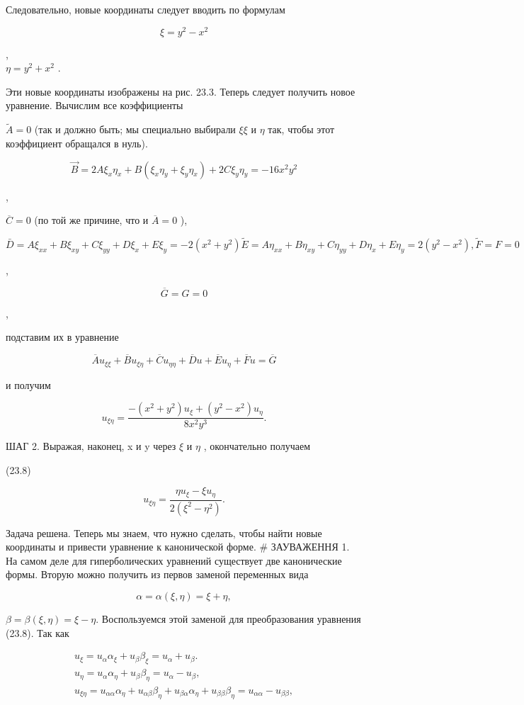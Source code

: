 \documentclass[
  ukrainian,
]{article}
\begin{document}
Следовательно, новые координаты следует вводить по формулам

\[
\xi = y^2 - x^2
\]

,\\
\(\eta = y^2 + x^2\) .

Эти новые координаты изображены на рис. 23.3. Теперь следует получить
новое уравнение. Вычислим все коэффициенты

\(\widetilde{A} = 0\) (так и должно быть; мы специально выбирали
\(\xi \xi\) и \(\eta\) так, чтобы этот коэффициент обращался в нуль).

\[
\vec{B} = 2A\xi_x\eta_x + B(\xi_x\eta_y + \xi_y\eta_x) + 2C\xi_y\eta_y = -16x^2y^2
\]

,

\(\overline{C} = 0\) (по той же причине, что и \(\overline{A} = 0\) ),

\[
\bar{D} = A\xi_{xx} + B\xi_{xy} + C\xi_{yy} + D\xi_x + E\xi_y = -2(x^2 + y^2)
\widetilde{E} = A\eta_{xx} + B\eta_{xy} + C\eta_{yy} + D\eta_x + E\eta_y = 2(y^2 - x^2),
\tilde{F} = F = 0
\]

,

\[
\overline{G} = G = 0
\]

,

подставим их в уравнение

\[
\overline{A}u_{\xi\xi} + \overline{B}u_{\xi\eta} + \overline{C}u_{\eta\eta} + \overline{D}u + \overline{E}u_{\eta} + \overline{F}u = \overline{G}
\]

и получим

\[
u_{\xi\eta} = \frac{-(x^2 + y^2) u_{\xi} + (y^2 - x^2) u_{\eta}}{8x^2y^3}.
\]

ШАГ 2. Выражая, наконец, x и y через \(\xi\) и \(\eta\) , окончательно
получаем

(23.8)

\[
u_{\xi\eta} = \frac{\eta u_{\xi} - \xi u_{\eta}}{2(\xi^2 - \eta^2)}.
\]

Задача решена. Теперь мы знаем, что нужно сделать, чтобы найти новые
координаты и привести уравнение к канонической форме. \# ЗАУВАЖЕННЯ 1.
На самом деле для гиперболических уравнений существует две канонические
формы. Вторую можно получить из первов заменой переменных вида

\[
\alpha = \alpha (\xi, \eta) = \xi + \eta,
\]

\(\beta = \beta (\xi, \eta) = \xi - \eta.\) Воспользуемся этой заменой
для преобразования уравнения (23.8). Так как

\[
\begin{array}{l} u_{\xi} = u_{\alpha}\alpha_{\xi} + u_{\beta}\beta_{\xi} = u_{\alpha} + u_{\beta}. \\ u_{\eta} = u_{\alpha}\alpha_{\eta} + u_{\beta}\beta_{\eta} = u_{\alpha} - u_{\beta}, \\ u_{\xi\eta} = u_{\alpha\alpha}\alpha_{\eta} + u_{\alpha\beta}\beta_{\eta} + u_{\beta\alpha}\alpha_{\eta} + u_{\beta\beta}\beta_{\eta} = u_{\alpha\alpha} - u_{\beta\beta}, \end{array}
\]
\end{document}
